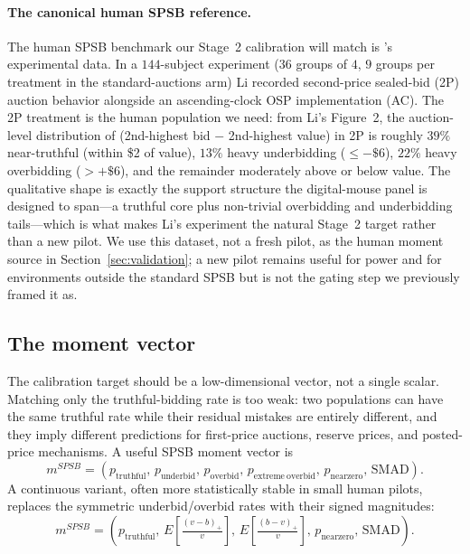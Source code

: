\documentclass[12pt]{article}
\newcommand{\SPSB}{SPSB}
\begin{document}
\paragraph{The canonical human \SPSB{} reference.} The human \SPSB{}
benchmark our Stage~2 calibration will match is
\citet{li2017}'s experimental data. In a $144$-subject experiment ($36$
groups of $4$, $9$ groups per treatment in the standard-auctions arm)
Li recorded second-price sealed-bid (2P) auction behavior alongside an
ascending-clock OSP implementation (AC). The 2P treatment is the human
population we need: from Li's Figure~2, the auction-level distribution
of (2nd-highest bid $-$ 2nd-highest value) in 2P is roughly $39\%$
near-truthful (within \$2 of value), $13\%$ heavy underbidding
($\le -\$6$), $22\%$ heavy overbidding ($> +\$6$), and the remainder
moderately above or below value. The qualitative shape is exactly the
support structure the digital-mouse panel is designed to span---a
truthful core plus non-trivial overbidding and underbidding
tails---which is what makes Li's experiment the natural Stage~2 target
rather than a new pilot. We use this dataset, not a fresh pilot, as
the human moment source in Section~\ref{sec:validation}; a new pilot
remains useful for power and for environments outside the standard
\SPSB{} but is not the gating step we previously framed it as.

\subsection{The moment vector}
\label{sec:moments}

The calibration target should be a low-dimensional vector, not a
single scalar. Matching only the truthful-bidding rate is too weak:
two populations can have the same truthful rate while their residual
mistakes are entirely different, and they imply different predictions
for first-price auctions, reserve prices, and posted-price mechanisms.
A useful \SPSB{} moment vector is
\begin{equation}
m^{\SPSB}
=
\left(
p_{\mathrm{truthful}},\,
p_{\mathrm{underbid}},\,
p_{\mathrm{overbid}},\,
p_{\mathrm{extreme\ overbid}},\,
p_{\mathrm{nearzero}},\,
\mathrm{SMAD}
\right).
\label{eq:moments-discrete}
\end{equation}
A continuous variant, often more statistically stable in small human
pilots, replaces the symmetric underbid/overbid rates with their
signed magnitudes:
\begin{equation}
m^{\SPSB}
=
\left(
p_{\mathrm{truthful}},\,
E\!\left[\tfrac{(v-b)_+}{v}\right],\,
E\!\left[\tfrac{(b-v)_+}{v}\right],\,
p_{\mathrm{nearzero}},\,
\mathrm{SMAD}
\right).
\label{eq:moments-continuous}
\end{equation}
\end{document}
